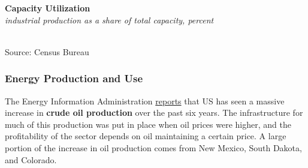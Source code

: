 \documentclass{report}
\makeatletter
\newcommand{\tbllink}[1]{\href{https://raw.githubusercontent.com/bdecon/US-chartbook/master/chartbook/data/#1}{\faTable}}
\newcommand*\short[1]{\expandafter\@gobbletwo\number\numexpr#1\relax}
\newcommand{\stdnode}[3]{\node[below, align=left, shift=({#1,#2})]{#3};}
\newcommand{\dateaxisticks}{
		date coordinates in=x, axis line style={draw=none},
		xmax={2020-05-10},
		max space between ticks=40,	    
		xtick={{1990-01-01}, {1992-01-01}, {1994-01-01}, 
			{1996-01-01}, {1998-01-01}, {2000-01-01}, 
			{2002-01-01}, {2004-01-01}, {2006-01-01},
			{2008-01-01}, {2010-01-01}, {2012-01-01}, {2014-01-01},
		    {2016-01-01}, {2018-01-01}, {2020-01-01}},
		minor xtick={{1989-01-01}, {1991-01-01}, {1993-01-01},
			{1995-01-01}, {1997-01-01}, {1999-01-01}, 
			{2001-01-01}, {2003-01-01}, {2005-01-01}, {2007-01-01},
		    {2009-01-01}, {2011-01-01}, {2013-01-01}, {2015-01-01},
		    {2017-01-01}, {2019-01-01}},
		enlarge y limits={0.06}, enlarge x limits={0.01},
		}
\newcommand{\bbar}[2]{extra #1 ticks = {{#2}}, extra #1 tick labels = ,
		extra #1 tick style = {grid=major, grid style={thick, black!25}},}
\newcommand{\stdline}[4]{\addplot[very thick, no markers, color=#1] 
		table [x=#2, y=#3, col sep=comma] {#4};	}
\newcommand{\thickline}[4]{\addplot[ultra thick, no markers, color=#1] 
		table [x=#2, y=#3, col sep=comma] {#4};	}
\newcommand{\rbars}{
		\fill[color=black!10] (axis cs:{1990-07-01},\pgfkeysvalueof{/pgfplots/ymin}) rectangle 
			(axis cs:{1991-03-01}, \pgfkeysvalueof{/pgfplots/ymax});
		\fill[color=black!10] (axis cs:{2007-12-01},\pgfkeysvalueof{/pgfplots/ymin}) rectangle 
			(axis cs:{2009-07-01}, \pgfkeysvalueof{/pgfplots/ymax});
		\fill[color=black!10] (axis cs:{2001-03-01},\pgfkeysvalueof{/pgfplots/ymin}) rectangle 
			(axis cs:{2001-11-01}, \pgfkeysvalueof{/pgfplots/ymax});}
\makeatother
\begin{document}
{{{{{{\begin{minipage}{0.76\textwidth}
\noindent \normalsize \textbf{Capacity Utilization}\\
\footnotesize{\textit{industrial production as a share of total capacity, percent}}\\ 
\noindent \hspace*{-2mm} \\
\footnotesize{Source: Census Bureau} \hfill \tbllink{tcu.csv}

\end{minipage}

\newpage

\subsubsection*{\color{black!70} \seriffont Energy Production and Use}

\begin{minipage}{0.76\textwidth}

\small The Energy Information Administration \href{https://www.eia.gov/dnav/pet/pet_crd_crpdn_adc_mbblpd_m.htm}{reports} that US has seen a massive increase in \textbf{crude oil production} over the past six years. The infrastructure for much of this production was put in place when oil prices were higher, and the profitability of the sector depends on oil maintaining a certain price. A large portion of the increase in oil production comes from New Mexico, South Dakota, and Colorado. \\

\vspace{2mm}


\end{minipage}}}}}}}
\end{document}
